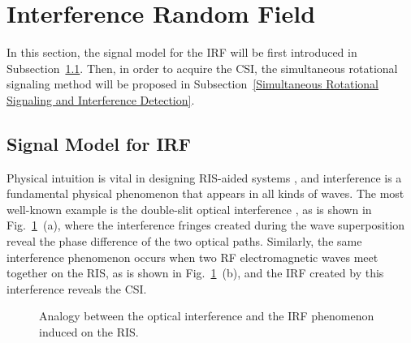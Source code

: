 \documentclass[journal,twocolumn]{IEEEtran}
\theoremstyle{nonumberplain}
\begin{document}
\section{Interference Random Field}
\label{Interference Random Field}
    In this section, the signal model for the \ac{IRF} will be first introduced in Subsection~\ref{Models for IRFs}. Then, in order to acquire the CSI, the simultaneous rotational signaling method will be proposed in Subsection~\ref{Simultaneous Rotational Signaling and Interference Detection}. 

\subsection{Signal Model for IRF}
\label{Models for IRFs}

    Physical intuition is vital in designing RIS-aided systems \cite{najafi2020physics}, and interference is a fundamental physical phenomenon that appears in all kinds of waves. The most well-known example is the double-slit optical interference \cite{louradour1993interference}, as is shown in Fig.~\ref{fig:scheme}~(a), where the interference fringes created during the wave superposition reveal the phase difference of the two optical paths. Similarly, the same interference phenomenon occurs when two RF electromagnetic waves meet together on the RIS, as is shown in Fig.~\ref{fig:scheme}~(b), and the \ac{IRF} created by this interference reveals the \ac{CSI}. 
    \ifx\onecol\undefined
    \begin{figure}[t]
        \centering
        \caption{Analogy between the optical interference and the \ac{IRF} phenomenon induced on the RIS.}
        \label{fig:scheme}
    \end{figure}
\end{document}
